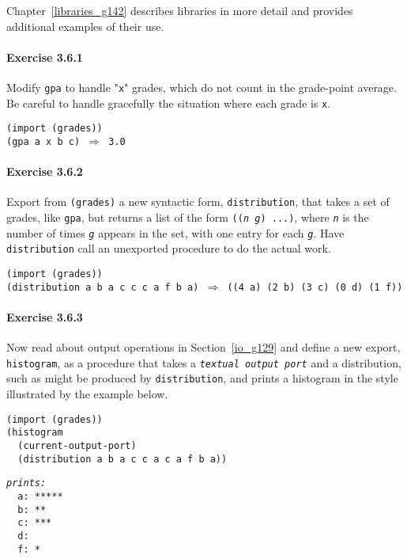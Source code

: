 Chapter \ref{libraries_g142} describes libraries in more detail and
provides additional examples of their use.


\paragraph{Exercise \label{further_g85}3.6.1}


\label{further_s90}Modify \texttt{gpa} to handle "\texttt{x}" grades, which do not
count in the grade-point average.
Be careful to handle gracefully the situation where each grade is \texttt{x}.


\begin{alltt}
(import (grades))
(gpa a x b c) \(\Rightarrow\) 3.0
\end{alltt}




\paragraph{Exercise \label{further_g86}3.6.2}


\label{further_s91}Export from \texttt{(grades)} a new syntactic form, \texttt{distribution},
that takes a set of grades, like \texttt{gpa}, but returns a list of the
form \texttt{((\textit{n} \textit{g}) ...)}, where \texttt{\textit{n}} is the number of
times \texttt{\textit{g}} appears in the set, with one entry for each \texttt{\textit{g}}.
Have \texttt{distribution} call an unexported procedure to do the actual
work.


\begin{alltt}
(import (grades))
(distribution a b a c c c a f b a) \(\Rightarrow\) ((4 a) (2 b) (3 c) (0 d) (1 f))
\end{alltt}



\paragraph{Exercise \label{further_g87}3.6.3}


\label{further_s92}Now read about output operations in Section \ref{io_g129} and define
a new export, \texttt{histogram}, as a procedure that takes a
\texttt{\textit{textual output port}} and a distribution, such as might be
produced by \texttt{distribution}, and prints a histogram in the style
illustrated by the example below.


\begin{alltt}
(import (grades))
(histogram
  (current-output-port)
  (distribution a b a c c a c a f b a))

\textit{prints:}
  a: *****
  b: **
  c: ***
  d: 
  f: *
\end{alltt}



